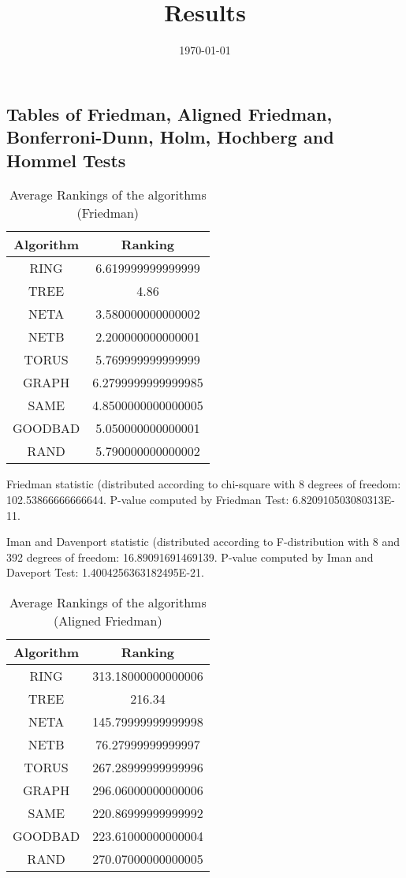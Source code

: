 \documentclass[a4paper,10pt]{article}
\title{Results}
\author{}
\date{\today}
\begin{document}
\begin{landscape}
\oddsidemargin 0in \topmargin 0in\maketitle
\section{Tables of Friedman, Aligned Friedman, Bonferroni-Dunn, Holm, Hochberg and Hommel Tests}
\begin{table}[!htp]
\centering
\caption{Average Rankings of the algorithms (Friedman)
}\begin{tabular}{c|c}
Algorithm&Ranking\\
\hline
 RING&6.619999999999999\\
 TREE&4.86\\
 NETA&3.580000000000002\\
 NETB&2.200000000000001\\
 TORUS&5.769999999999999\\
 GRAPH&6.2799999999999985\\
 SAME&4.8500000000000005\\
 GOODBAD&5.050000000000001\\
 RAND&5.790000000000002\\
\end{tabular}
\end{table}


Friedman statistic (distributed according to chi-square with 8 degrees of freedom: 102.53866666666644. 
P-value computed by Friedman Test: 6.820910503080313E-11.\newline

Iman and Davenport statistic (distributed according to F-distribution with 8 and 392 degrees of freedom: 16.89091691469139. 
P-value computed by Iman and Daveport Test: 1.4004256363182495E-21.\newline


\newpage

\begin{table}[!htp]
\centering
\caption{Average Rankings of the algorithms (Aligned Friedman)
}\begin{tabular}{c|c}
Algorithm&Ranking\\
\hline
 RING&313.18000000000006\\
 TREE&216.34\\
 NETA&145.79999999999998\\
 NETB&76.27999999999997\\
 TORUS&267.28999999999996\\
 GRAPH&296.06000000000006\\
 SAME&220.86999999999992\\
 GOODBAD&223.61000000000004\\
 RAND&270.07000000000005\\
\end{tabular}
\end{table}



\end{landscape}
\end{document}
